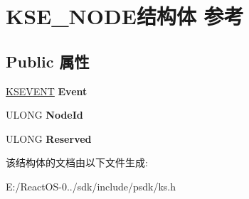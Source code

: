 \hypertarget{struct_k_s_e___n_o_d_e}{}\section{K\+S\+E\+\_\+\+N\+O\+D\+E结构体 参考}
\label{struct_k_s_e___n_o_d_e}
\subsection*{Public 属性}
\begin{DoxyCompactItemize}
\item 
\mbox{\label{struct_k_s_e___n_o_d_e_a4cb64f73520b29b7b62d3710f2116536}} 
\hyperlink{struct_k_s_i_d_e_n_t_i_f_i_e_r}{K\+S\+E\+V\+E\+NT} {\bfseries Event}
\item 
\mbox{\label{struct_k_s_e___n_o_d_e_ac1c51c2e8b05532a521623aeea149ea0}} 
U\+L\+O\+NG {\bfseries Node\+Id}
\item 
\mbox{\label{struct_k_s_e___n_o_d_e_acd7c218fedb770934488ce65586aaddc}} 
U\+L\+O\+NG {\bfseries Reserved}
\end{DoxyCompactItemize}


该结构体的文档由以下文件生成\+:\begin{DoxyCompactItemize}
\item 
E\+:/\+React\+O\+S-\/0../sdk/include/psdk/ks.\+h\end{DoxyCompactItemize}
